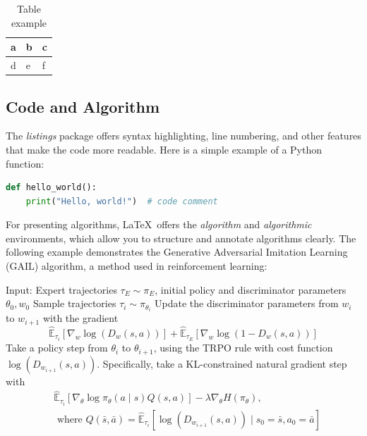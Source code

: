 \begin{table}[h!]
\centering
\begin{tabular}{|l|l|l|}
\hline
a & b & c \\ \hline
d & e & f \\ \hline
\end{tabular}
\caption{Table example}
\label{tab1}
\end{table}

\subsection{Code and Algorithm}
The \textit{listings} package offers syntax highlighting, line numbering, and other features that make the code more readable. Here is a simple example of a Python function:

\begin{lstlisting}[language=Python]
def hello_world():
    print("Hello, world!")  # code comment
\end{lstlisting}

For presenting algorithms, \LaTeX\ offers the \textit{algorithm} and \textit{algorithmic} environments, which allow you to structure and annotate algorithms clearly. The following example demonstrates the Generative Adversarial Imitation Learning (GAIL) algorithm, a method used in reinforcement learning:

\begin{algorithm}
    \caption{Generative Adversarial Imitation Learning (GAIL)}
    \label{alg1}
    \begin{algorithmic}[1]
    \State Input: Expert trajectories $\tau_E \sim \pi_E$, initial policy and discriminator parameters $\theta_0, w_0$
        \State Sample trajectories $\tau_i \sim \pi_{\theta_i}$
        \State Update the discriminator parameters from $w_i$ to $w_{i+1}$ with the gradient
        $$
            \hat{\mathbb{E}}_{\tau_i}\left[\nabla_w \log \left(D_w(s, a)\right)\right]+\hat{\mathbb{E}}_{\tau_E}\left[\nabla_w \log \left(1-D_w(s, a)\right)\right]
        $$
        \State Take a policy step from $\theta_i$ to $\theta_{i+1}$, using the TRPO rule with cost function $\log \left(D_{w_{i+1}}(s, a)\right)$. Specifically, take a KL-constrained natural gradient step with
        \begin{align*}
            & \hat{\mathbb{E}}_{\tau_i}\left[\nabla_\theta \log \pi_\theta(a \mid s) Q(s, a)\right]-\lambda \nabla_\theta H\left(\pi_\theta\right), \\
            & \text { where } Q(\bar{s}, \bar{a})=\hat{\mathbb{E}}_{\tau_i}\left[\log \left(D_{w_{i+1}}(s, a)\right) \mid s_0=\bar{s}, a_0=\bar{a}\right]
        \end{align*}
    \EndFor
    \end{algorithmic}
\end{algorithm}


